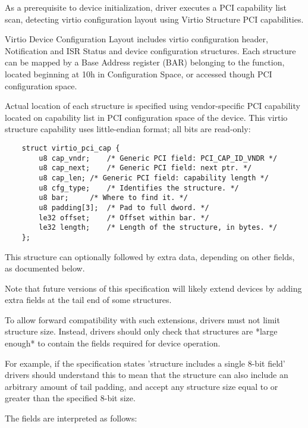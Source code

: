 As a prerequisite to device initialization, driver executes a
PCI capability list scan, detecting virtio configuration layout using Virtio
Structure PCI capabilities.

Virtio Device Configuration Layout includes virtio configuration header, Notification
and ISR Status and device configuration structures.
Each structure can be mapped by a Base Address register (BAR) belonging to
the function, located beginning at 10h in Configuration Space,
or accessed though PCI configuration space.

Actual location of each structure is specified using vendor-specific PCI capability located
on capability list in PCI configuration space of the device.
This virtio structure capability uses little-endian format; all bits are
read-only:

\begin{lstlisting}
	struct virtio_pci_cap {
		u8 cap_vndr;	/* Generic PCI field: PCI_CAP_ID_VNDR */
		u8 cap_next;	/* Generic PCI field: next ptr. */
		u8 cap_len;	/* Generic PCI field: capability length */
		u8 cfg_type;	/* Identifies the structure. */
		u8 bar;		/* Where to find it. */
		u8 padding[3];	/* Pad to full dword. */
		le32 offset;	/* Offset within bar. */
		le32 length;	/* Length of the structure, in bytes. */
	};
\end{lstlisting}

This structure can optionally followed by extra data, depending on
other fields, as documented below.

Note that future versions of this specification will likely
extend devices by adding extra fields at the tail end of some structures.

To allow forward compatibility with such extensions, drivers must
not limit structure size.  Instead, drivers should only
check that structures are *large enough* to contain the fields
required for device operation.

For example, if the specification states 'structure includes a
single 8-bit field' drivers should understand this to mean that
the structure can also include an arbitrary amount of tail padding,
and accept any structure size equal to or greater than the
specified 8-bit size.

The fields are interpreted as follows:

